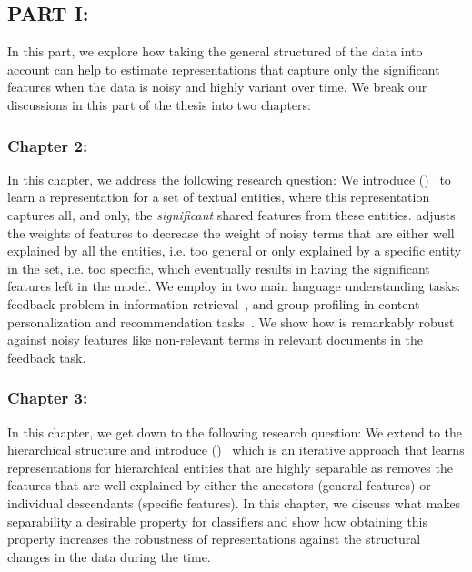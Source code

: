 \subsection*{PART I: }
In this part, we explore how taking the general structured of the data into account can help to estimate representations that capture only the significant features when the data is noisy and highly variant over time. We break our discussions in this part of the thesis into two chapters:

\subsubsection*{Chapter 2: }
In this chapter, we address the following research question:
We introduce \emph{\swlm} (\acswlm)~\citep{Dehghani:2016:SIGIR} to learn a representation for a set of textual entities, where this representation captures all, and only, the \textit{significant} shared features from these entities.  \acswlm adjusts the weights of features to decrease the weight of noisy terms that are either well explained by all the entities, i.e. too general or only explained by a specific entity in the set, i.e. too specific, which eventually results in having the significant features left in the model.  
We employ \acswlm in two main language understanding tasks: feedback problem in information retrieval~\citep{Dehghani:CIKM2016:long, Dehghani:CIKM2016:short}, and group profiling in content personalization and recommendation tasks~\citep{Dehghani:2016:CHIIR,Dehghani2016:trec}. We show how \acswlm is remarkably robust against noisy features like non-relevant terms in relevant documents in the feedback task. 

\subsubsection*{Chapter 3: }
In this chapter, we get down to the following research question:
We extend \emph{\swlms} to the hierarchical structure and introduce \emph{\hswlms} (\achswlm)~\citep{Dehghani:2016:ICTIR, Dehghani:2016:CLEF} which is an iterative approach that learns representations for hierarchical entities that are highly separable as \acswlm removes the features that are well explained by either the ancestors (general features) or individual descendants (specific features). In this chapter, we discuss what makes separability a desirable property for classifiers and show how obtaining this property increases the robustness of representations against the structural changes in the data during the time.

